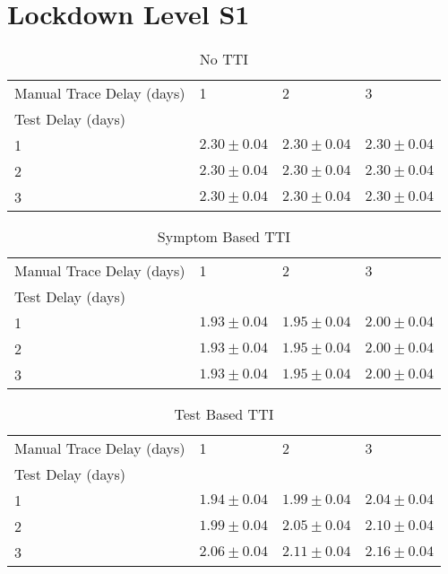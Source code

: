 \documentclass{article}
\begin{document}
    

\section{Lockdown Level S1}


    \begin{table}[H]
         \begin{tabular}{llll}
\toprule
Manual Trace Delay (days) &                1 &                2 &                3 \\
Test Delay (days) &                  &                  &                  \\
\midrule
1                 &  $2.30 \pm 0.04$ &  $2.30 \pm 0.04$ &  $2.30 \pm 0.04$ \\
2                 &  $2.30 \pm 0.04$ &  $2.30 \pm 0.04$ &  $2.30 \pm 0.04$ \\
3                 &  $2.30 \pm 0.04$ &  $2.30 \pm 0.04$ &  $2.30 \pm 0.04$ \\
\bottomrule
\end{tabular}

        \caption{No TTI}
    \end{table}
    


    \begin{table}[H]
         \begin{tabular}{llll}
\toprule
Manual Trace Delay (days) &                1 &                2 &                3 \\
Test Delay (days) &                  &                  &                  \\
\midrule
1                 &  $1.93 \pm 0.04$ &  $1.95 \pm 0.04$ &  $2.00 \pm 0.04$ \\
2                 &  $1.93 \pm 0.04$ &  $1.95 \pm 0.04$ &  $2.00 \pm 0.04$ \\
3                 &  $1.93 \pm 0.04$ &  $1.95 \pm 0.04$ &  $2.00 \pm 0.04$ \\
\bottomrule
\end{tabular}

        \caption{Symptom Based TTI}
    \end{table}
    


    \begin{table}[H]
         \begin{tabular}{llll}
\toprule
Manual Trace Delay (days) &                1 &                2 &                3 \\
Test Delay (days) &                  &                  &                  \\
\midrule
1                 &  $1.94 \pm 0.04$ &  $1.99 \pm 0.04$ &  $2.04 \pm 0.04$ \\
2                 &  $1.99 \pm 0.04$ &  $2.05 \pm 0.04$ &  $2.10 \pm 0.04$ \\
3                 &  $2.06 \pm 0.04$ &  $2.11 \pm 0.04$ &  $2.16 \pm 0.04$ \\
\bottomrule
\end{tabular}

        \caption{Test Based TTI}
    \end{table}
    
\end{document}
